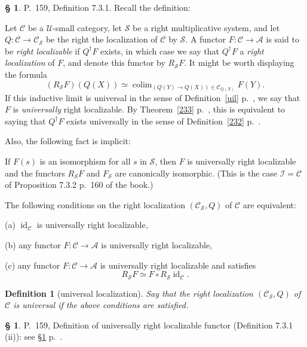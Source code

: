 \documentclass[12pt]{article}
\newtheorem{df}[thm]{Definition}
\theoremstyle{remark}
\theoremstyle{definition}
\newtheorem{s}[thm]{\S}
\newcommand{\nn}{\noindent}
\newcommand{\cc}{\mathcal}
\newcommand{\A}{\mathcal A}
\newcommand{\C}{\mathcal C}
\newcommand{\U}{\mathcal U}
\DeclareMathOperator*{\colim}{colim}
\DeclareMathOperator{\id}{id}
\begin{document}
\begin{s}\label{durl} 
P.~159, Definition 7.3.1. Recall the definition: 

Let $\C$ be a $\U$-small category, let $\cc S$ be a right multiplicative system, and let $Q:\C\to\C_{\cc S}$ be the right the localization of $\C$ by $\cc S$. A functor $F:\C\to\A$ is said to be {\em right localizable} if $Q^\dagger F$ exists, in which case we say that $Q^\dagger F$ a {\em right localization} of $F$, and denote this functor by $R_{\cc S}F$. It might be worth displaying the formula 
$$
(R_{\cc S}F)(Q(X))\simeq\colim_{(Q(Y)\to Q(X))\in\C_{Q(X)}}F(Y).
$$
If this inductive limit is universal in the sense of Definition~\ref{uil} p.~\pageref{uil}, we say that $F$ is {\em universally} right localizable.  By Theorem~\ref{233} p.~\pageref{233}, this is equivalent to saying that $Q^\dagger F$ exists universally in the sense of Definition~\ref{232} p.~\pageref{232}. 

Also, the following fact is implicit:

If $F(s)$ is an isomorphism for all $s$ in $\cc S$, then $F$ is universally right localizable and the functors $R_{\cc S}F$ and $F_{\cc S}$ are canonically isomorphic. (This is the case $\cc I=\C$ of Proposition 7.3.2 p.~160 of the book.)

The following conditions on the right localization $(\C_{\cc S},Q)$ of $\C$ are equivalent: 

\nn(a) $\id_\C$ is universally right localizable, 

\nn(b) any functor $F:\C\to\A$ is universally right localizable, 

\nn(c) any functor $F:\C\to\A$ is universally right localizable and satisfies 
$$
R_{\cc S}F\simeq F\circ R_{\cc S}\id_\C.
$$

\begin{df}[universal localization]\label{url2} 
Say that the right localization $(\C_{\cc S},Q)$ of $\C$ is {\em universal} if the above conditions are satisfied.
\end{df}
\end{s}

%

\begin{s}
P.~159, Definition of universally right localizable functor (Definition 7.3.1 (ii)): see \S\ref{durl} p.~\pageref{durl}. 
\end{s}

%
\end{document}
